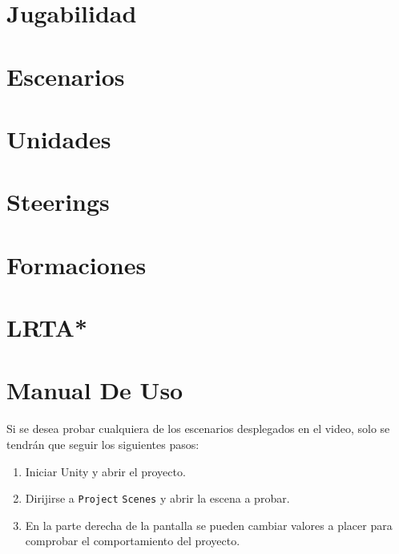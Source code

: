 \section{Jugabilidad}

\section{Escenarios}

\section{Unidades}

\section{Steerings}

\section{Formaciones}

\section{LRTA*}

\section{Manual De Uso}
Si se desea probar cualquiera de los escenarios desplegados en el video, solo se tendrán que seguir los siguientes pasos:
\begin{enumerate}
    \item Iniciar Unity y abrir el proyecto.
    \item Dirijirse a \texttt{Project} \xrightarrow \texttt{Scenes} y abrir la escena a probar. 
    \item En la parte derecha de la pantalla se pueden cambiar valores a placer para comprobar el comportamiento del proyecto.
\end{enumerate}